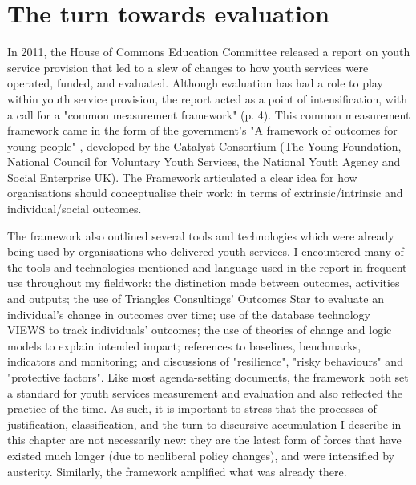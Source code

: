 \section{The turn towards evaluation}
\label{sec:6-2-turn-towards}
In 2011, the House of Commons Education Committee released a report on youth service provision that led to a slew of changes to how youth services were operated, funded, and evaluated. Although evaluation has had a role to play within youth service provision, the \citeyear{house_of_commons_education_committee_services_2011} report acted as a point of intensification, with a call for a "common measurement framework" (p. 4). This common measurement framework came in the form of the government's "A framework of outcomes for young people" \citep{mcneil_framework_2012}, developed by the Catalyst Consortium (The Young Foundation, National Council for Voluntary Youth Services, the National Youth Agency and Social Enterprise UK). The Framework articulated a clear idea for how organisations should conceptualise their work: in terms of extrinsic/intrinsic and individual/social outcomes.

The framework also outlined several tools and technologies which were already being used by organisations who delivered youth services. I encountered many of the tools and technologies mentioned and language used in the report in frequent use throughout my fieldwork: the distinction made between outcomes, activities and outputs; the use of Triangles Consultings' Outcomes Star to evaluate an individual's change in outcomes over time; use of the database technology VIEWS to track individuals' outcomes; the use of theories of change and logic models to explain intended impact; references to baselines, benchmarks, indicators and monitoring; and discussions of "resilience", "risky behaviours" and "protective factors". Like most agenda-setting documents, the framework both set a standard for youth services measurement and evaluation and also reflected the practice of the time. As such, it is important to stress that the processes of justification, classification, and the turn to discursive accumulation I describe in this chapter are not necessarily new: they are the latest form of forces that have existed much longer (due to neoliberal policy changes), and were intensified by austerity. Similarly, the framework amplified what was already there. 

